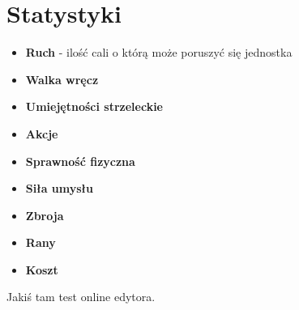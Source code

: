 \chapter{Statystyki}

\begin{itemize}
	\item \textbf{Ruch} - ilość cali o którą może poruszyć się jednostka 
	\item \textbf{Walka wręcz}
	\item \textbf{Umiejętności strzeleckie}
	\item \textbf{Akcje}
	\item \textbf{Sprawność fizyczna}
	\item \textbf{Siła umysłu}
	\item \textbf{Zbroja}
	\item \textbf{Rany}
	\item \textbf{Koszt}
	
\end{itemize}

Jakiś tam test online edytora. 